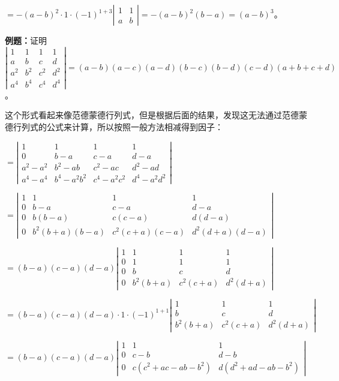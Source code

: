 \documentclass[UTF8, 12pt]{ctexart}
\begin{document}
$=-(a-b)^2\cdot1\cdot(-1)^{1+3}\left|\begin{array}{cc} 
    1 & 1 \\
    a & b
\end{array}\right|=-(a-b)^2(b-a)=(a-b)^3$。

\textbf{例题：}证明$\left|\begin{array}{cccc} 
    1 & 1 & 1 & 1 \\
    a & b & c & d \\
    a^2 & b^2 & c^2 & d^2 \\
    a^4 & b^4 & c^4 & d^4
\end{array}\right|=(a-b)(a-c)(a-d)(b-c)(b-d)(c-d)(a+b+c+d)$。

这个形式看起来像范德蒙德行列式，但是根据后面的结果，发现这无法通过范德蒙德行列式的公式来计算，所以按照一般方法相减得到因子：

$=\left|\begin{array}{cccc} 
    1 & 1 & 1 & 1 \\
    0 & b-a & c-a & d-a \\
    a^2-a^2 & b^2-ab & c^2-ac & d^2-ad \\
    a^4-a^4 & b^4-a^2b^2 & c^4-a^2c^2 & d^4-a^2d^2
\end{array}\right|$

$=\left|\begin{array}{cccc} 
    1 & 1 & 1 & 1 \\
    0 & b-a & c-a & d-a \\
    0 & b(b-a) & c(c-a) & d(d-a) \\
    0 & b^2(b+a)(b-a) & c^2(c+a)(c-a) & d^2(d+a)(d-a)
\end{array}\right|$

$=(b-a)(c-a)(d-a)\left|\begin{array}{cccc} 
    1 & 1 & 1 & 1 \\
    0 & 1 & 1 & 1 \\
    0 & b & c & d \\
    0 & b^2(b+a) & c^2(c+a) & d^2(d+a)
\end{array}\right|$

$=(b-a)(c-a)(d-a)\cdot 1\cdot(-1)^{1+1}\left|\begin{array}{ccc}
    1 & 1 & 1 \\
    b & c & d \\
    b^2(b+a) & c^2(c+a) & d^2(d+a)
\end{array}\right|$

$=(b-a)(c-a)(d-a)\left|\begin{array}{ccc}
    1 & 1 & 1 \\
    0 & c-b & d-b \\
    0 & c(c^2+ac-ab-b^2) & d(d^2+ad-ab-b^2)
\end{array}\right|$
\end{document}
